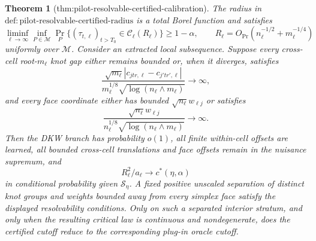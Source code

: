 \documentclass{article}
\newtheorem{theorem}{Theorem}
\begin{document}
\begin{theorem}[thm:pilot-resolvable-certified-calibration]\label{thm:pilot-resolvable-certified-calibration}
The radius in \(\mathrm{def:pilot\mbox{-}resolvable\mbox{-}certified\mbox{-}radius}\) is a total Borel function and satisfies
\[
 \liminf_{\ell\to\infty}\inf_{P\in\mathcal M}
 \Pr_P\{(\tau_{t,\ell})_{t>T_0}\in\mathcal C_\ell(R_\ell)\}
 \geq1-\alpha,
 \qquad
 R_\ell=O_{\Pr}(n_\ell^{-1/2}+m_\ell^{-1/4})
\]
uniformly over \(\mathcal M\).  Consider an extracted local subsequence.  Suppose every cross-cell root-\(m_\ell\) knot gap either remains bounded or, when it diverges, satisfies
\[
 \frac{\sqrt{m_\ell}
 |c_{jtr,\ell}-c_{j'tr',\ell}|}
 {m_\ell^{1/8}\sqrt{\log(n_\ell\wedge m_\ell)}}\longrightarrow\infty,
\]
and every face coordinate either has bounded \(\sqrt{n_\ell}w_{\ell j}\) or satisfies
\[
 \frac{\sqrt{n_\ell}w_{\ell j}}
 {n_\ell^{1/8}\sqrt{\log(n_\ell\wedge m_\ell)}}
 \longrightarrow\infty.
\]
Then the DKW branch has probability \(o(1)\), all finite within-cell offsets are learned, all bounded cross-cell translations and face offsets remain in the nuisance supremum, and
\[
 R_\ell^2/a_\ell\longrightarrow c^*(\eta,\alpha)
\]
in conditional probability given \(\mathscr S_\eta\).  A fixed positive unscaled separation of distinct knot groups and weights bounded away from every simplex face satisfy the displayed resolvability conditions.  Only on such a separated interior stratum, and only when the resulting critical law is continuous and nondegenerate, does the certified cutoff reduce to the corresponding plug-in oracle cutoff.
\end{theorem}
\end{document}
